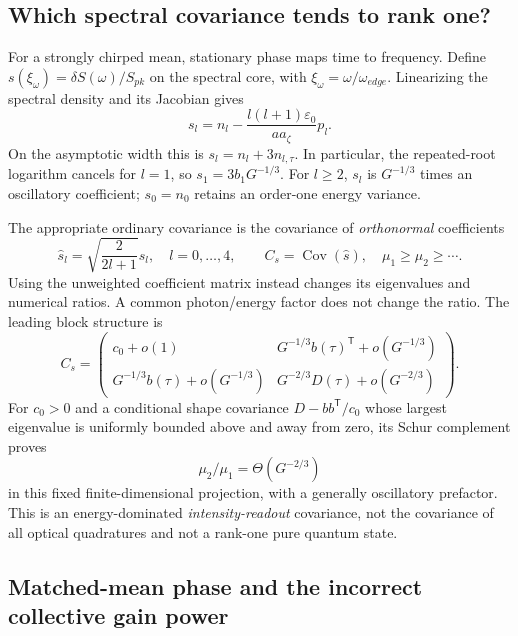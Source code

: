 \documentclass[11pt,a4paper]{article}
\newcommand{\Cov}{\operatorname{Cov}}
\newcommand{\eps}{\varepsilon}
\begin{document}
\subsection{Which spectral covariance tends to rank one?}

For a strongly chirped mean, stationary phase maps time to frequency. Define $s(\xi_\omega)=\delta S(\omega)/S_{pk}$ on the spectral core, with $\xi_\omega=\omega/\omega_{edge}$. Linearizing the spectral density and its Jacobian gives
\begin{equation}\label{eq:specmap}
s_l=n_l-\frac{l(l+1)\eps_0}{aa_\zeta}p_l.
\end{equation}
On the asymptotic width this is $s_l=n_l+3n_{l,\tau}$. In particular, the repeated-root logarithm cancels for $l=1$, so $s_1=3b_1G^{-1/3}$. For $l\ge2$, $s_l$ is $G^{-1/3}$ times an oscillatory coefficient; $s_0=n_0$ retains an order-one energy variance.

The appropriate ordinary covariance is the covariance of \emph{orthonormal} coefficients
\begin{equation}
\widehat s_l=\sqrt{\frac{2}{2l+1}}s_l,\quad l=0,\ldots,4,
\qquad C_s=\Cov(\widehat s),\quad \mu_1\ge\mu_2\ge\cdots.
\end{equation}
Using the unweighted coefficient matrix instead changes its eigenvalues and numerical ratios. A common photon/energy factor does not change the ratio. The leading block structure is
\begin{equation}
C_s=\begin{pmatrix}
c_0+o(1)&G^{-1/3}b(\tau)^{\mathsf T}+o(G^{-1/3})\\
G^{-1/3}b(\tau)+o(G^{-1/3})&G^{-2/3}D(\tau)+o(G^{-2/3})
\end{pmatrix}.
\end{equation}
For $c_0>0$ and a conditional shape covariance $D-bb^{\mathsf T}/c_0$ whose largest eigenvalue is uniformly bounded above and away from zero, its Schur complement proves
\begin{equation}
\boxed{\mu_2/\mu_1=\Theta(G^{-2/3})}
\end{equation}
in this fixed finite-dimensional projection, with a generally oscillatory prefactor. This is an energy-dominated \emph{intensity-readout} covariance, not the covariance of all optical quadratures and not a rank-one pure quantum state.

\subsection{Matched-mean phase and the incorrect collective gain power}
\end{document}
